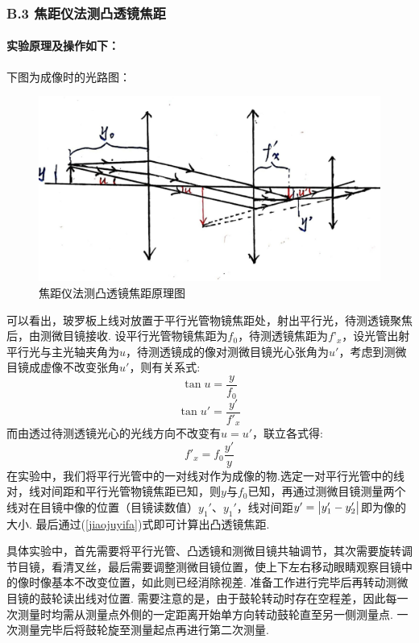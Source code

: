 \documentclass[UTF8]{ctexart}
\begin{document}
\subsubsection*{B.3 焦距仪法测凸透镜焦距}
\paragraph{实验原理及操作如下：}\quad\par
下图为成像时的光路图：
\begin{figure}[H]
    \begin{center}
    \includegraphics[scale=0.2]{1.jpg}\vspace{0em}
    \caption{焦距仪法测凸透镜焦距原理图}
    \end{center}
\end{figure}
可以看出，玻罗板上线对放置于平行光管物镜焦距处，射出平行光，待测透镜聚焦后，由测微目镜接收. 设平行光管物镜焦距为$f_0$，待测透镜焦距为$f’_x$，设光管出射平行光与主光轴夹角为$u$，待测透镜成的像对测微目镜光心张角为$u'$，考虑到测微目镜成虚像不改变张角$u'$，则有关系式:
\[\tan u=\frac{y}{f_0}\]
\[\tan u'=\frac{y'}{f'_x}\]
而由透过待测透镜光心的光线方向不改变有$u=u'$，联立各式得:
\begin{equation}
\label{jiaojuyifa}
f'_x=f_0\frac{y'}{y}
\end{equation}
在实验中，我们将平行光管中的一对线对作为成像的物.选定一对平行光管中的线对，线对间距和平行光管物镜焦距已知，则$y$与$f_0$已知，再通过测微目镜测量两个线对在目镜中像的位置（目镜读数值）$y_{1}'$、$y_{1}'$，线对间距$y'=\big{|}y_1'-y_2'\big{|}$即为像的大小. 最后通过(\ref{jiaojuyifa})式即可计算出凸透镜焦距.\par
具体实验中，首先需要将平行光管、凸透镜和测微目镜共轴调节，其次需要旋转调节目镜，看清叉丝，最后需要调整测微目镜位置，使上下左右移动眼睛观察目镜中的像时像基本不改变位置，如此则已经消除视差. 准备工作进行完毕后再转动测微目镜的鼓轮读出线对位置. 需要注意的是，由于鼓轮转动时存在空程差，因此每一次测量时均需从测量点外侧的一定距离开始单方向转动鼓轮直至另一侧测量点. 一次测量完毕后将鼓轮旋至测量起点再进行第二次测量.\par
\end{document}
